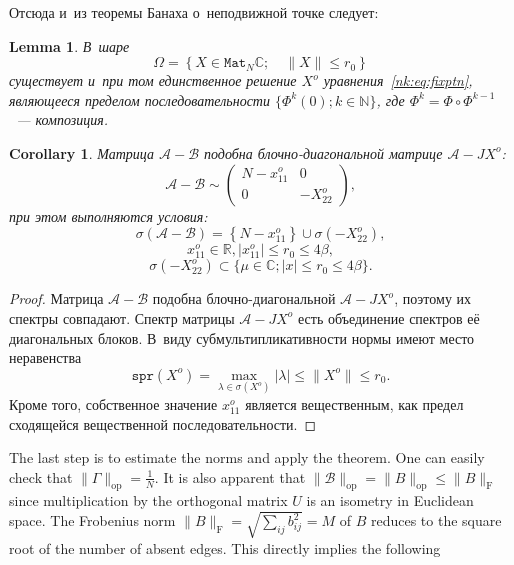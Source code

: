 \documentclass[14pt,a4paper]{extarticle}
\newtheorem{lem}{Lemma}
\newtheorem{crl}{Corollary}
\theoremstyle{definition}
\begin{document}
Отсюда и~из теоремы Банаха о~неподвижной точке следует:
\begin{lem}
В~шаре \[ \Omega = \left\{ X\in\mathtt{Mat}_N\mathbb{C}; \quad \|X\| \leq r_0 \right\} \]
    существует и~при том единственное решение \( X^o \) уравнения~\eqref{nk:eq:fixptn},
    являющееся пределом последовательности \( \{ \Phi^k(0); k\in\mathbb{N} \} \),
    где \( \Phi^k = \Phi\circ\Phi^{k-1} \)~--- композиция.
\end{lem}

\begin{crl}
Матрица \( \mathcal{A} - \mathcal{B} \) подобна блочно-диагональной матрице \( \mathcal{A} - J X^o \):
\[ \mathcal{A} - \mathcal{B} \sim
\begin{pmatrix}
N - x_{11}^o & 0 \\
0 & -X_{22}^o
\end{pmatrix}, \]
при этом выполняются условия:
\[ \sigma\left(\mathcal{A} - \mathcal{B}\right) = \left\{N-x_{11}^o\right\}\cup \sigma\left(-X_{22}^o\right), \]
    \[ x_{11}^o\in\mathbb{R}, \lvert x_{11}^o \rvert \leq r_0 \leq 4\beta, \]
\[ \sigma\left(-X_{22}^o\right) \subset \{ \mu\in\mathbb{C}; \lvert x \rvert \leq r_0 \leq 4\beta \}. \]
\end{crl}
\begin{proof}
    Матрица \( \mathcal{A} - \mathcal{B} \) подобна блочно-диагональной \( \mathcal{A} - J X^o \),
    поэтому их спектры совпадают.
    Спектр матрицы \( \mathcal{A} - J X^o \) есть объединение спектров е\"е диагональных блоков.
    В~виду субмультипликативности нормы имеют место неравенства
    \[ \mathtt{spr}(X^o) = \max_{\lambda\in\sigma(X^o)}\lvert\lambda\rvert \leq \|X^o\| \leq r_0. \]
    Кроме того, собственное значение \( x_{11}^o \) является вещественным, как предел сходящейся вещественной последовательности.
\end{proof}

The last step is to estimate the norms and apply the theorem.
One can easily check that \( \|\Gamma\|_{\mathrm{op}} = \frac1N \).
It is also apparent that \( \|\mathcal{B}\|_{\mathrm{op}} = \|B\|_{\mathrm{op}} \leq \|B\|_{\mathrm{F}} \)
    since multiplication by the orthogonal matrix \( U \)
    is an isometry in Euclidean space.
The Frobenius norm \( {\|B\|_{\mathrm{F}} = \sqrt{\sum_{ij} b_{ij}^2} = M} \)
    of \( B \)
    reduces to the square root of the number of absent edges.
This directly implies the following
\end{document}
